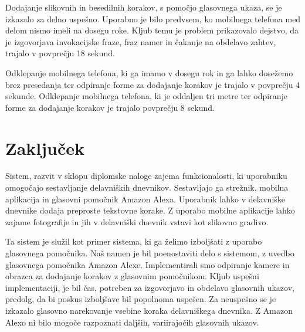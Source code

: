 \documentclass[a4paper, 12pt]{book}
\begin{document}
Dodajanje slikovnih in besedilnih korakov, s pomočjo glasovnega ukaza, se je izkazalo za delno uspešno.
Uporabno je bilo predvsem, ko mobilnega telefona med delom nismo imeli na dosegu roke.
Kljub temu je problem prikazovalo dejstvo, da je izgovorjava invokacijske fraze, fraz namer in čakanje na obdelavo zahtev, trajalo v povprečju 18 sekund.


Odklepanje mobilnega telefona, ki ga imamo v dosegu rok in ga lahko dosežemo brez presedanja ter odpiranje forme za dodajanje korakov je trajalo v povprečju 4 sekunde.
Odklepanje mobilnega telefona, ki je oddaljen tri metre ter odpiranje forme za dodajanje korakov je trajalo povprečju 8 sekund.







\chapter{Zaključek}

Sistem, razvit v sklopu diplomske naloge zajema funkcionalosti, ki uporabniku omogočajo sestavljanje delavniških dnevnikov.
Sestavljajo ga strežnik, mobilna aplikacija in glasovni pomočnik Amazon Alexa.
Uporabnik lahko v delavniške dnevnike dodaja preproste tekstovne korake.
Z uporabo mobilne aplikacije lahko zajame fotografije in jih v delavniški dnevnik vstavi kot slikovno gradivo.

Ta sistem je služil kot primer sistema, ki ga želimo izboljšati z uporabo glasovnega pomočnika.
Naš namen je bil poenostaviti delo s sistemom, z uvedbo glasovnega pomočnika Amazon Alexe.
Implementirali smo odpiranje kamere in obrazca za dodajanje korakov z glasovnim pomočnikom.
Kljub uspešni implementaciji, je bil čas, potreben za izgovorjavo in obdelavo glasovnih ukazov, predolg, da bi poskus izboljšave bil popolnoma uspešen.
Za neuspešno se je izkazalo glasovno narekovanje vsebine koraka delavniškega dnevnika.
Z Amazon Alexo ni bilo mogoče razpoznati daljših, variirajočih glasovnih ukazov.
\end{document}
